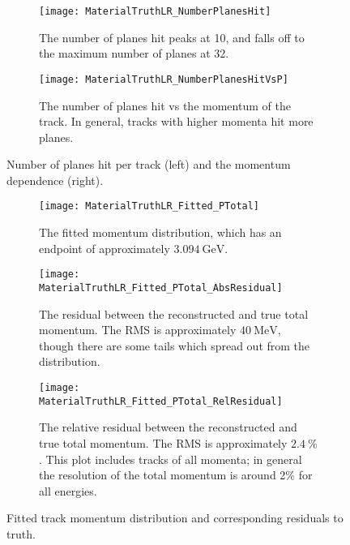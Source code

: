     \begin{figure}
    \centering
        \begin{subfigure}[t]{0.45\textwidth}
            \centering
            \texttt{[image: MaterialTruthLR\_NumberPlanesHit]}
            \caption{The number of planes hit peaks at 10, and falls off to the maximum number of planes at 32.}
        \end{subfigure}
        \hspace{5mm}
        \begin{subfigure}[t]{0.45\textwidth}
            \centering
            \texttt{[image: MaterialTruthLR\_NumberPlanesHitVsP]}
            \caption{The number of planes hit vs the momentum of the track. In general, tracks with higher momenta hit more planes.}
        \end{subfigure}
    \caption[Number of planes hit for fitted tracks]{Number of planes hit per track (left) and the momentum dependence (right).}
    \label{fig:NumberOfPlanesHit}
    \end{figure}


    \begin{figure}
    \centering
        \begin{subfigure}[t]{0.6\textwidth}
            \centering
            \texttt{[image: MaterialTruthLR\_Fitted\_PTotal]}
            \caption{The fitted momentum distribution, which has an endpoint of approximately $\SI{3.094}{\GeV}$.}
        \end{subfigure}%

        \vspace{2mm}
        \begin{subfigure}[t]{0.45\textwidth}
            \centering
            \texttt{[image: MaterialTruthLR\_Fitted\_PTotal\_AbsResidual]}
            \caption{The residual between the reconstructed and true total momentum. The RMS is approximately $\SI{40}{\MeV}$, though there are some tails which spread out from the distribution.}
        \end{subfigure}
        \hspace{5mm}
        \begin{subfigure}[t]{0.45\textwidth}
            \centering
            \texttt{[image: MaterialTruthLR\_Fitted\_PTotal\_RelResidual]}
            \caption{The relative residual between the reconstructed and true total momentum. The RMS is approximately $\SI{2.4}{\%}$. This plot includes tracks of all momenta; in general the resolution of the total momentum is around 2\% for all energies.}
        \end{subfigure}%
    \caption[Fitted track momentum distribution and corresponding residuals to truth]{Fitted track momentum distribution and corresponding residuals to truth.}
    \label{fig:MaterialTotalMomentum}
    \end{figure}


